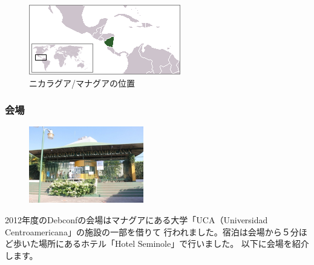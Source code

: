 \documentclass[mingoth,a4paper]{jsarticle}
\begin{document}
\begin{figure}[ht]
\begin{center}
\includegraphics[width=0.8\hsize]{image201208/debconf12_LocationNicaragua.png}
\caption{ニカラグア/マナグアの位置}
\end{center}
\end{figure}

\subsubsection{会場}

\begin{figure}
  \includegraphics[width=5cm]{image201208/debconf12_mainentry.jpg}
\end{figure}

2012年度のDebconfの会場はマナグアにある大学「UCA（Universidad Centroamericana」の施設の一部を借りて
行われました。宿泊は会場から５分ほど歩いた場所にあるホテル「Hotel Seminole」で行いました。
以下に会場を紹介します。
\\
\end{document}
